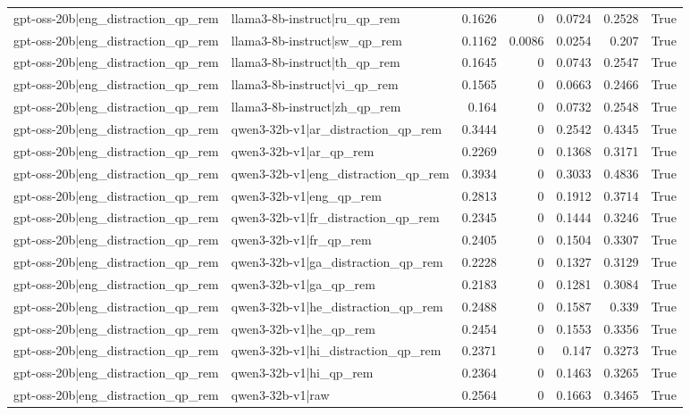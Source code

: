 \begin{table}
\begin{tabular}{l l r r r r l}
gpt-oss-20b|eng_distraction_qp_rem & llama3-8b-instruct|ru_qp_rem & 0.1626 & 0 & 0.0724 & 0.2528 & True \\
gpt-oss-20b|eng_distraction_qp_rem & llama3-8b-instruct|sw_qp_rem & 0.1162 & 0.0086 & 0.0254 & 0.207 & True \\
gpt-oss-20b|eng_distraction_qp_rem & llama3-8b-instruct|th_qp_rem & 0.1645 & 0 & 0.0743 & 0.2547 & True \\
gpt-oss-20b|eng_distraction_qp_rem & llama3-8b-instruct|vi_qp_rem & 0.1565 & 0 & 0.0663 & 0.2466 & True \\
gpt-oss-20b|eng_distraction_qp_rem & llama3-8b-instruct|zh_qp_rem & 0.164 & 0 & 0.0732 & 0.2548 & True \\
gpt-oss-20b|eng_distraction_qp_rem & qwen3-32b-v1|ar_distraction_qp_rem & 0.3444 & 0 & 0.2542 & 0.4345 & True \\
gpt-oss-20b|eng_distraction_qp_rem & qwen3-32b-v1|ar_qp_rem & 0.2269 & 0 & 0.1368 & 0.3171 & True \\
gpt-oss-20b|eng_distraction_qp_rem & qwen3-32b-v1|eng_distraction_qp_rem & 0.3934 & 0 & 0.3033 & 0.4836 & True \\
gpt-oss-20b|eng_distraction_qp_rem & qwen3-32b-v1|eng_qp_rem & 0.2813 & 0 & 0.1912 & 0.3714 & True \\
gpt-oss-20b|eng_distraction_qp_rem & qwen3-32b-v1|fr_distraction_qp_rem & 0.2345 & 0 & 0.1444 & 0.3246 & True \\
gpt-oss-20b|eng_distraction_qp_rem & qwen3-32b-v1|fr_qp_rem & 0.2405 & 0 & 0.1504 & 0.3307 & True \\
gpt-oss-20b|eng_distraction_qp_rem & qwen3-32b-v1|ga_distraction_qp_rem & 0.2228 & 0 & 0.1327 & 0.3129 & True \\
gpt-oss-20b|eng_distraction_qp_rem & qwen3-32b-v1|ga_qp_rem & 0.2183 & 0 & 0.1281 & 0.3084 & True \\
gpt-oss-20b|eng_distraction_qp_rem & qwen3-32b-v1|he_distraction_qp_rem & 0.2488 & 0 & 0.1587 & 0.339 & True \\
gpt-oss-20b|eng_distraction_qp_rem & qwen3-32b-v1|he_qp_rem & 0.2454 & 0 & 0.1553 & 0.3356 & True \\
gpt-oss-20b|eng_distraction_qp_rem & qwen3-32b-v1|hi_distraction_qp_rem & 0.2371 & 0 & 0.147 & 0.3273 & True \\
gpt-oss-20b|eng_distraction_qp_rem & qwen3-32b-v1|hi_qp_rem & 0.2364 & 0 & 0.1463 & 0.3265 & True \\
gpt-oss-20b|eng_distraction_qp_rem & qwen3-32b-v1|raw & 0.2564 & 0 & 0.1663 & 0.3465 & True \\

\end{tabular}
\end{table}
